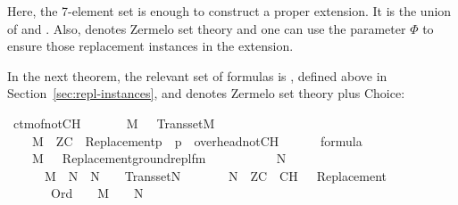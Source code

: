Here, the 7-element set  is enough to construct a proper
extension. It is  the union of
 and
.
Also,
 denotes Zermelo set theory and one
can use the parameter $\Phi$ to ensure those replacement instances in the extension.

In the
next theorem, the relevant set of formulas is
, defined above in
Section~\ref{sec:repl-instances}, and  denotes Zermelo set
theory plus Choice:

\begin{isabelle}
\isamarkupfalse%
\ ctm{\isacharunderscore}{\kern0pt}of{\isacharunderscore}{\kern0pt}not{\isacharunderscore}{\kern0pt}CH{\isacharcolon}{\kern0pt}\isanewline
\ \ \isanewline
\ \ \ \ {\isachardoublequoteopen}M\ {\isasymapprox}\ {\isasymomega}{\isachardoublequoteclose}\ {\isachardoublequoteopen}Transset{\isacharparenleft}{\kern0pt}M{\isacharparenright}{\kern0pt}{\isachardoublequoteclose}\isanewline
\ \ \ \ {\isachardoublequoteopen}M\ {\isasymTurnstile}\ ZC\ {\isasymunion}\ {\isacharbraceleft}{\kern0pt}{\isasymcdot}Replacement{\isacharparenleft}{\kern0pt}p{\isacharparenright}{\kern0pt}{\isasymcdot}\ {\isachardot}{\kern0pt}\ p\ {\isasymin}\ overhead{\isacharunderscore}{\kern0pt}notCH{\isacharbraceright}{\kern0pt}{\isachardoublequoteclose}\isanewline
\ \ \ \ {\isachardoublequoteopen}{\isasymPhi}\ {\isasymsubseteq}\ formula{\isachardoublequoteclose}\isanewline
\ \ \ \ {\isachardoublequoteopen}M\ {\isasymTurnstile}\ {\isacharbraceleft}{\kern0pt}\ {\isasymcdot}Replacement{\isacharparenleft}{\kern0pt}ground{\isacharunderscore}{\kern0pt}repl{\isacharunderscore}{\kern0pt}fm{\isacharparenleft}{\kern0pt}{\isasymphi}{\isacharparenright}{\kern0pt}{\isacharparenright}{\kern0pt}{\isasymcdot}\ {\isachardot}{\kern0pt}\ {\isasymphi}\ {\isasymin}\ {\isasymPhi}{\isacharbraceright}{\kern0pt}{\isachardoublequoteclose}\isanewline
\ \ \isanewline
\ \ \ \ {\isachardoublequoteopen}{\isasymexists}N{\isachardot}{\kern0pt}\isanewline
\ \ \ \ \ \ M\ {\isasymsubseteq}\ N\ {\isasymand}\ N\ {\isasymapprox}\ {\isasymomega}\ {\isasymand}\ Transset{\isacharparenleft}{\kern0pt}N{\isacharparenright}{\kern0pt}\ {\isasymand}\isanewline
\ \ \ \ \ \ N\ {\isasymTurnstile}\ ZC\ {\isasymunion}\ {\isacharbraceleft}{\kern0pt}{\isasymcdot}{\isasymnot}{\isasymcdot}CH{\isasymcdot}{\isasymcdot}{\isacharbraceright}{\kern0pt}\ {\isasymunion}\ {\isacharbraceleft}{\kern0pt}\ {\isasymcdot}Replacement{\isacharparenleft}{\kern0pt}{\isasymphi}{\isacharparenright}{\kern0pt}{\isasymcdot}\ {\isachardot}{\kern0pt}\ {\isasymphi}\ {\isasymin}\ {\isasymPhi}{\isacharbraceright}{\kern0pt}\ {\isasymand}\isanewline
\ \ \ \ \ \ {\isacharparenleft}{\kern0pt}{\isasymforall}{\isasymalpha}{\isachardot}{\kern0pt}\ Ord{\isacharparenleft}{\kern0pt}{\isasymalpha}{\isacharparenright}{\kern0pt}\ {\isasymlongrightarrow}\ {\isacharparenleft}{\kern0pt}{\isasymalpha}\ {\isasymin}\ M\ {\isasymlongleftrightarrow}\ {\isasymalpha}\ {\isasymin}\ N{\isacharparenright}{\kern0pt}{\isacharparenright}{\kern0pt}{\isachardoublequoteclose}
\end{isabelle}

